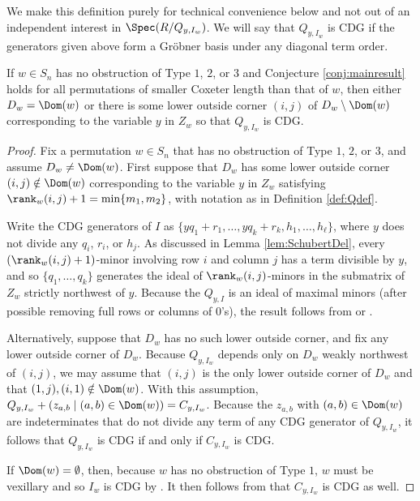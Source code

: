 We make this definition purely for technical convenience below and not out of an independent interest in $\Spec(R/Q_{y,I_w})$.  We will say that $Q_{y,I_w}$ is CDG if the generators given above form a Gr\"obner basis under any diagonal term order.  

\begin{lemma}\label{lem:GrobnerQs}
If $w \in S_n$ has no obstruction of Type $1$, $2$, or $3$ and Conjecture \ref{conj:mainresult} holds for all permutations of smaller Coxeter length than that of $w$, then either $D_w = \Dom(w)$ or there is some lower outside corner $(i,j)$ of $D_w \setminus \Dom(w)$ corresponding to the variable $y$ in $Z_w$ so that $Q_{y,I_w}$ is CDG.
\end{lemma}
\begin{proof}
Fix a permutation $w \in S_n$ that has no obstruction of Type $1$, $2$, or $3$, and assume $D_w \neq \Dom(w)$.  First suppose that $D_w$ has some lower outside corner $(i,j)\notin \Dom(w)$ corresponding to the variable $y$ in $Z_w$ satisfying $\rank_w(i,j)+1 = \min\{m_1,m_2\}$, with notation as in Definition \ref{def:Qdef}.  

Write the CDG generators of $I$ as $\{yq_1+r_1, \ldots, yq_k+r_k, h_1, \ldots, h_\ell \}$, where $y$ does not divide any $q_i$, $r_i$, or $h_j$.  As discussed in Lemma \ref{lem:SchubertDel}, every $(\rank_w(i,j)+1)$-minor involving row $i$ and column $j$ has a term divisible by $y$, and so $\{q_1, \ldots, q_k\}$ generates the ideal of $\rank_w(i,j)$-minors in the submatrix of $Z_w$ strictly northwest of $y$.  Because the $Q_{y,I}$ is an ideal of maximal minors (after possible removing full rows or columns of $0$'s), the result follows from \cite[Theorem 4.2]{CDG15} or \cite[Proposition 5.4]{Boo11}.  

Alternatively, suppose that $D_w$ has no such lower outside corner, and fix any lower outside corner of $D_w$.  Because $Q_{y,I_w}$ depends only on $D_w$ weakly northwest of $(i,j)$, we may assume that $(i,j)$ is the only lower outside corner of $D_w$ and that $(1,j), (i,1) \notin \Dom(w)$.  With this assumption, $Q_{y,I_w} +(z_{a,b} \mid (a,b) \in \Dom(w))= C_{y,I_w}$.  Because the $z_{a,b}$ with $(a,b) \in \Dom(w)$ are indeterminates that do not divide any term of any CDG generator of $Q_{y,I_w}$, it follows that $Q_{y,I_w}$ is CDG if and only if $C_{y,I_w}$ is CDG.  

If $\Dom(w) = \emptyset$, then, because $w$ has no obstruction of Type $1$, $w$ must be vexillary and so $I_w$ is CDG by \cite[Theorem 3.8]{KMY09}.   It then follows from  \cite[Theorem 2.1(a)]{KMY09} that $C_{y,I_w}$ is CDG as well.  


\end{proof}
